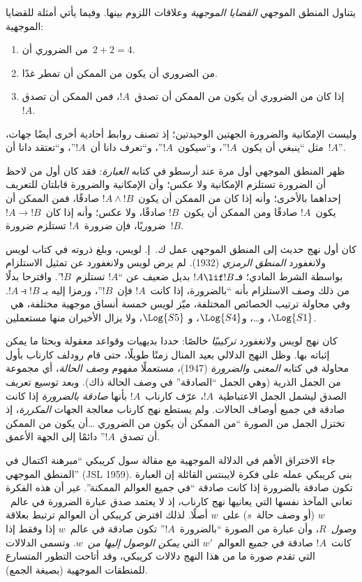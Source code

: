 \documentclass[../../../include/open-logic-section]{subfiles}
\begin{document}


يتناول المنطق الموجهي \emph{القضايا الموجهية} وعلاقات اللزوم بينها.
وفيما يأتي أمثلة للقضايا الموجهية:
\begin{enumerate}
\item من الضروري أن~$2+2=4$.
\item من الضروري أن يكون من الممكن أن تمطر غدًا.
\item إذا كان من الضروري أن يكون من الممكن أن تصدق~$!A$، فمن الممكن أن تصدق~$!A$.
\end{enumerate}
وليست الإمكانية والضرورة الجهتين الوحيدتين؛ إذ تصنف روابط أحادية أخرى
أيضًا جهات، مثل ``ينبغي أن يكون~$!A$''، و``سيكون~$!A$''، و``تعرف دانا
أن~$!A$''، و``تعتقد دانا أن~$!A$''.

ظهر المنطق الموجهي أول مرة عند أرسطو في كتابه \emph{العبارة}: فقد كان
أول من لاحظ أن الضرورة تستلزم الإمكانية ولا عكس؛ وأن الإمكانية
والضرورة قابلتان للتعريف إحداهما بالأخرى؛ وأنه إذا كان من الممكن أن
يكون~$!A \land !B$ صادقًا، فمن الممكن أن يكون~$!A$ صادقًا ومن الممكن
أن يكون~$!B$ صادقًا، ولا عكس؛ وأنه إذا كان~$!A \to !B$ ضروريًا، فإن
ضرورة~$!A$ تستلزم ضرورة~$!B$.

كان أول نهج حديث إلى المنطق الموجهي عمل ك.~إ. لويس، وبلغ ذروته في
كتاب لويس ولانغفورد \emph{المنطق الرمزي} (1932). لم يرض لويس ولانغفورد
عن تمثيل الاستلزام بواسطة الشرط المادي؛ فـ$!A \lif !B$ بديل ضعيف عن
``$!A$ تستلزم~$!B$''. واقترحا بدلًا من ذلك وصف الاستلزام بأنه
``بالضرورة، إذا كانت~$!A$ فإن~$!B$''، ورمزا إليه بـ
$!A \strictif !B$. وفي محاولة ترتيب الخصائص المختلفة، ميّز لويس خمسة
أنساق موجهية مختلفة، هي~$\Log{S1}$، و\ldots، و$\Log{S4}$، و
$\Log{S5}$، ولا يزال الأخيران منها مستعملين.

كان نهج لويس ولانغفورد \emph{تركيبيًا} خالصًا: حددا بديهيات وقواعد
معقولة وبحثا ما يمكن إثباته بها. وظل النهج الدلالي بعيد المنال زمنًا
طويلًا، حتى قام رودلف كارناب بأول محاولة في كتابه \emph{المعنى
والضرورة} (1947)، مستعملًا مفهوم \emph{وصف الحالة}، أي مجموعة من الجمل
الذرية (وهي الجمل ``الصادقة'' في وصف الحالة ذاك). وبعد توسيع تعريف
الصدق ليشمل الجمل الاعتباطية~$!A$، عرّف كارناب~$!A$ بأنها
\emph{صادقة بالضرورة} إذا كانت صادقة في جميع أوصاف الحالات. ولم يستطع
نهج كارناب معالجة الجهات \emph{المكررة}، إذ تختزل الجمل من الصورة
``من الممكن أن يكون من الضروري \ldots أن يكون من الممكن أن تصدق~$!A$'' دائمًا إلى الجهة
الأعمق.

جاء الاختراق الأهم في الدلالة الموجهية مع مقالة سول كريبكي ``مبرهنة
اكتمال في المنطق الموجهي'' (JSL 1959). بنى كريبكي عمله على فكرة
لايبنتس القائلة إن العبارة تكون صادقة بالضرورة إذا كانت صادقة ``في
جميع العوالم الممكنة''. غير أن هذه الفكرة تعاني المآخذ نفسها التي
يعانيها نهج كارناب، إذ لا يعتمد صدق عبارة الضرورة في عالم~$w$ (أو وصف
حالة~$s$) على~$w$ أصلًا. لذلك افترض كريبكي أن العوالم ترتبط بعلاقة
\emph{وصول}~$R$، وأن عبارة من الصورة ``بالضرورة~$!A$'' تكون صادقة في
عالم~$w$ إذا وفقط إذا كانت~$!A$ صادقة في جميع العوالم~$w'$ التي
\emph{يمكن الوصول إليها من}~$w$. وتسمى الدلالات التي تقدم صورة ما من
هذا النهج دلالات كريبكي، وقد أتاحت التطور المتسارع للمنطقات الموجهية
(بصيغة الجمع).
\end{document}
